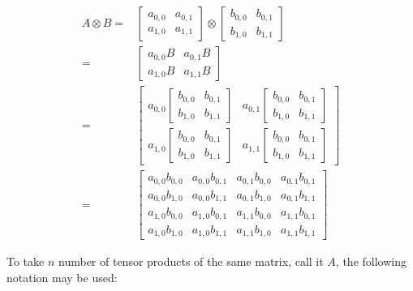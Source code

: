 \begin{example}
\begin{align}
A \otimes B =& \left[\begin{array}{ll}
a_{0,0} & a_{0,1} \\
a_{1,0} & a_{1,1}
\end{array}\right] \otimes 
\left[\begin{array}{ll}
b_{0,0} & b_{0,1} \\
b_{1,0} & b_{1,1}
\end{array}\right] \\
=&\left[\begin{array}{ll}
a_{0,0} B & a_{0,1} B \\
a_{1,0} B & a_{1,1} B
\end{array}\right]\\
=&\left[\begin{array}{ll}
a_{0,0}\left[\begin{array}{ll}
b_{0,0} & b_{0,1} \\
b_{1,0} & b_{1,1}
\end{array}\right] & a_{0,1}\left[\begin{array}{ll}
b_{0,0} & b_{0,1} \\
b_{1,0} & b_{1,1}
\end{array}\right] \\
a_{1,0}\left[\begin{array}{ll}
b_{0,0} & b_{0,1} \\
b_{1,0} & b_{1,1}
\end{array}\right] & a_{1,1}\left[\begin{array}{ll}
b_{0,0} & b_{0,1} \\
b_{1,0} & b_{1,1}
\end{array}\right]
\end{array}\right]\\
=&\left[\begin{array}{llll}
a_{0,0} b_{0,0} & a_{0,0} b_{0,1} & a_{0,1} b_{0,0} & a_{0,1} b_{0,1} \\
a_{0,0} b_{1,0} & a_{0,0} b_{1,1} & a_{0,1} b_{1,0} & a_{0,1} b_{1,1} \\
a_{1,0} b_{0,0} & a_{1,0} b_{0,1} & a_{1,1} b_{0,0} & a_{1,1} b_{0,1} \\
a_{1,0} b_{1,0} & a_{1,0} b_{1,1} & a_{1,1} b_{1,0} & a_{1,1} b_{1,1}
\end{array}\right]
\end{align}
\end{example}

To take $n$ number of tensor products of the same matrix, call it $A$, the following notation may be used:

